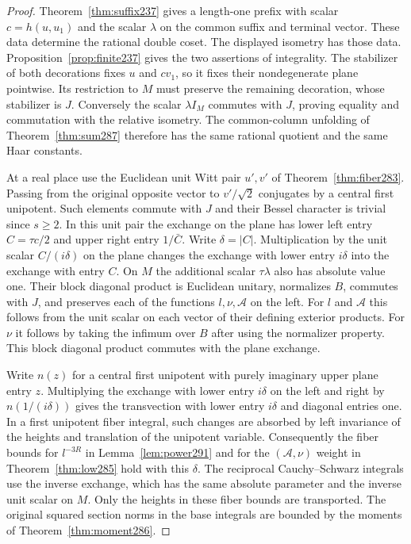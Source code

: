 \documentclass[a4paper,11pt]{article}
\theoremstyle{definition}
\theoremstyle{remark}
\numberwithin{equation}{section}
\begin{document}
\begin{proof}
Theorem~\ref{thm:suffix237} gives a length-one prefix
with scalar \(c=h(u,u_1)\) and the scalar \(\lambda\) on
the common suffix and terminal vector. These data determine
the rational double coset. The displayed isometry has
those data. Proposition~\ref{prop:finite237} gives the
two assertions of integrality. The stabilizer of both
decorations fixes \(u\) and \(c v_1\), so it fixes their
nondegenerate plane pointwise. Its restriction to \(M\)
must preserve the remaining decoration, whose stabilizer
is \(J\). Conversely the scalar \(\lambda I_M\) commutes
with \(J\), proving equality and commutation with the
relative isometry. The common-column unfolding of
Theorem~\ref{thm:sum287} therefore has the same rational
quotient and the same Haar constants.

At a real place use the Euclidean unit Witt pair \(u',v'\)
of Theorem~\ref{thm:fiber283}. Passing from the original
opposite vector to \(v'/\sqrt2\) conjugates by a central
first unipotent. Such elements commute with \(J\) and
their Bessel character is trivial since \(s\ge2\).
In this unit pair the exchange on the plane has lower
left entry \(C=\tau c/2\) and upper right entry
\(1/\bar C\). Write \(\delta=|C|\). Multiplication by
the unit scalar \(C/(i\delta)\) on the plane changes the
exchange with lower entry \(i\delta\) into the exchange
with entry \(C\). On \(M\) the additional scalar
\(\tau\lambda\) also has absolute value one. Their block
diagonal product is Euclidean unitary, normalizes \(B\),
commutes with \(J\), and preserves each of the functions
\(l,\nu,\mathcal A\) on the left. For \(l\) and \(\mathcal A\)
this follows from the unit scalar on each vector of their
defining exterior products. For \(\nu\) it follows by
taking the infimum over \(B\) after using the normalizer
property. This block diagonal product commutes with the
plane exchange.

Write \(n(z)\) for a central first unipotent with purely
imaginary upper plane entry \(z\). Multiplying the exchange
with lower entry \(i\delta\) on the left and right by
\(n(1/(i\delta))\) gives the transvection with lower
entry \(i\delta\) and diagonal entries one. In a first
unipotent fiber integral, such changes are absorbed by
left invariance of the heights and translation of the
unipotent variable. Consequently the fiber bounds for
\(l^{-3R}\) in Lemma~\ref{lem:power291} and for the
\((\mathcal A,\nu)\) weight in Theorem~\ref{thm:low285}
hold with this \(\delta\). The reciprocal Cauchy--Schwarz
integrals use the inverse exchange, which has the same
absolute parameter and the inverse unit scalar on \(M\).
Only the heights in these fiber bounds are transported.
The original squared section norms in the base integrals
are bounded by the moments of Theorem~\ref{thm:moment286}.


\end{proof}
\end{document}

